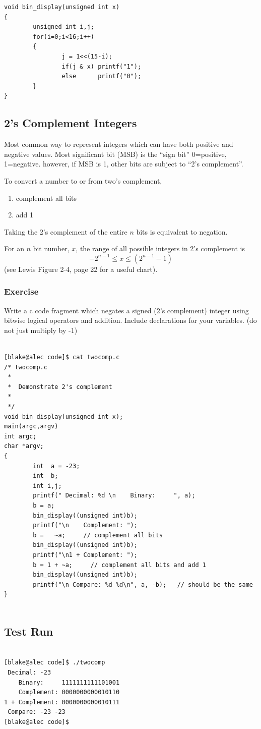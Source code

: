 \documentclass{article}	%
\begin{document}
\begin{verbatim}
void bin_display(unsigned int x)
{
        unsigned int i,j;
        for(i=0;i<16;i++)
        {
                j = 1<<(15-i);
                if(j & x) printf("1");
                else      printf("0");
        }
}

\end{verbatim}	%


\subsection{2's Complement Integers}
Most common way to represent integers which can have both positive and negative
values.   Most significant bit (MSB) is the ``sign bit'' 0=positive, 1=negative.
however, if MSB is 1, other bits are subject to ``2's complement''.

To convert a number to or from two's complement,
\begin{enumerate}
  \item complement all bits
  \item add 1
\end{enumerate}
Taking the 2's complement of the entire $n$ bits is equivalent to negation.

For an $n$ bit number, $x$,  the range of all possible integers in 2's complement is
\[
-2^{n-1} \leq x \leq (2^{n-1}-1)
\]
(see Lewis Figure 2-4, page 22 for a useful chart).


\subsubsection{Exercise}

Write a c code fragment which negates a signed (2's complement) integer
using bitwise logical operators and addition.  Include declarations for
your variables.
(do not just multiply by -1)



\begin{verbatim}

[blake@alec code]$ cat twocomp.c
/* twocomp.c
 *
 *  Demonstrate 2's complement
 *
 */
void bin_display(unsigned int x);
main(argc,argv)
int argc;
char *argv;
{
        int  a = -23;
        int  b;
        int i,j;
        printf(" Decimal: %d \n    Binary:     ", a);
        b = a;
        bin_display((unsigned int)b);
        printf("\n    Complement: ");
        b =   ~a;     // complement all bits
        bin_display((unsigned int)b);
        printf("\n1 + Complement: ");
        b = 1 + ~a;     // complement all bits and add 1
        bin_display((unsigned int)b);
        printf("\n Compare: %d %d\n", a, -b);   // should be the same
}


\end{verbatim}
\subsection{Test Run}
\begin{verbatim}

[blake@alec code]$ ./twocomp
 Decimal: -23
    Binary:     1111111111101001
    Complement: 0000000000010110
1 + Complement: 0000000000010111
 Compare: -23 -23
[blake@alec code]$

\end{verbatim}
\end{document}
